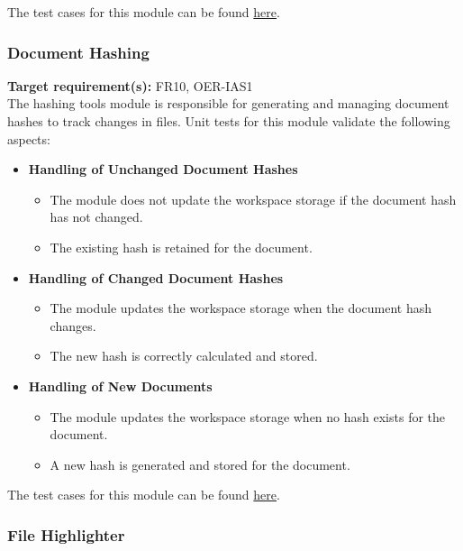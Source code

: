 \documentclass[12pt, titlepage]{article}
\begin{document}
\noindent The test cases for this module can be found \href{https://github.com/ssm-lab/capstone--sco-vs-code-plugin/blob/plugin-multi-file/test/commands/detectSmells.test.ts}{here}.

\subsubsection{Document Hashing}

\textbf{Target requirement(s):} FR10, OER-IAS1~\cite{SRS} \\

\noindent
The hashing tools module is responsible for generating and managing document hashes to track changes in files. Unit tests for this module validate the following aspects:

\begin{itemize}
  \item \textbf{Handling of Unchanged Document Hashes}
  \begin{itemize}
    \item The module does not update the workspace storage if the document hash has not changed.
    \item The existing hash is retained for the document.
  \end{itemize}

  \item \textbf{Handling of Changed Document Hashes}
  \begin{itemize}
      \item The module updates the workspace storage when the document hash changes.
      \item The new hash is correctly calculated and stored.
  \end{itemize}

  \item \textbf{Handling of New Documents}
  \begin{itemize}
      \item The module updates the workspace storage when no hash exists for the document.
      \item A new hash is generated and stored for the document.
  \end{itemize}
\end{itemize}

\noindent The test cases for this module can be found \href{https://github.com/ssm-lab/capstone--sco-vs-code-plugin/blob/plugin-multi-file/test/utils/hashDocs.test.ts}{here}.

\subsubsection{File Highlighter}
\end{document}
